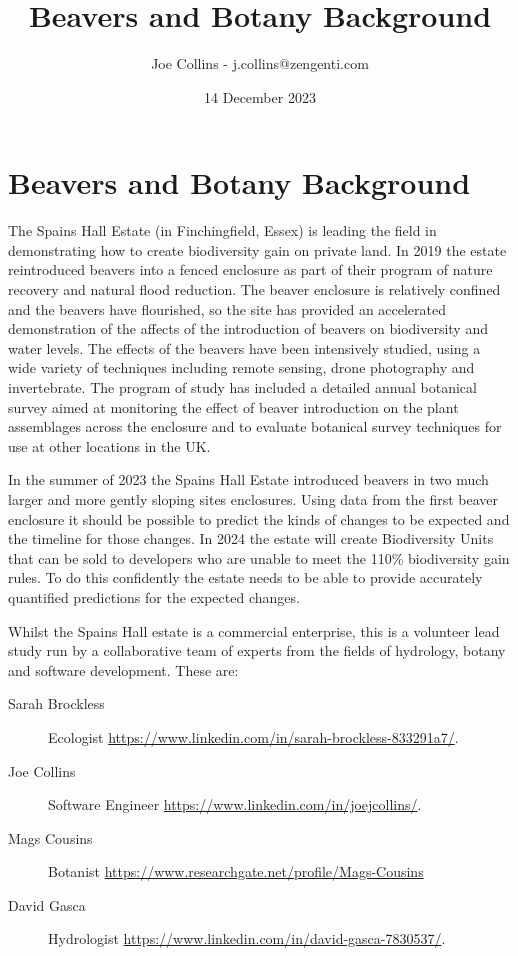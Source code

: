 \documentclass{roles}
\title{Beavers and Botany Background}
\author{Joe Collins - j.collins@zengenti.com}
\date{14 December 2023}
\begin{document}
\maketitle

\section*{Beavers and Botany Background}

The Spains Hall Estate
(in Finchingfield, Essex)
is leading the field in demonstrating
how to create biodiversity gain on private land.
In 2019 the estate reintroduced beavers into a fenced enclosure
as part of their program of nature recovery and natural flood reduction.
The beaver enclosure is relatively confined
and the beavers have flourished,
so the site has provided an accelerated demonstration of the affects of the introduction of beavers
on biodiversity and water levels.
The effects of the beavers have been intensively studied,
using a wide variety of techniques including remote sensing, drone photography and invertebrate.
The program of study has included a detailed annual botanical survey
aimed at monitoring the effect of beaver introduction on the plant assemblages across the enclosure
and to evaluate botanical survey techniques for use at other locations in the UK.

In the summer of 2023 the Spains Hall Estate
introduced beavers in two much larger and more gently sloping sites enclosures.
Using data from the first beaver enclosure
it should be possible to predict the kinds of changes to be expected and the timeline for those changes.
In 2024 the estate will create Biodiversity Units that can be sold to developers 
who are unable to meet the 110\% biodiversity gain rules.
To do this confidently the estate needs to be able to 
provide accurately quantified predictions for the expected changes.

Whilst the Spains Hall estate is a commercial enterprise,
this is a volunteer lead study
run by a collaborative team of experts from the fields of hydrology, botany and software development.
These are:

\begin{description}
    \item[Sarah Brockless] Ecologist \href{https://www.linkedin.com/in/sarah-brockless-833291a7/}{https://www.linkedin.com/in/sarah-brockless-833291a7/}.
    \item[Joe Collins] Software Engineer \href{https://www.linkedin.com/in/joejcollins/}{https://www.linkedin.com/in/joejcollins/}.
    \item[Mags Cousins] Botanist \href{https://www.researchgate.net/profile/Mags-Cousins}{https://www.researchgate.net/profile/Mags-Cousins}
    \item[David Gasca] Hydrologist \href{https://www.linkedin.com/in/david-gasca-7830537/}{https://www.linkedin.com/in/david-gasca-7830537/}.
\end{description}
\end{document}
